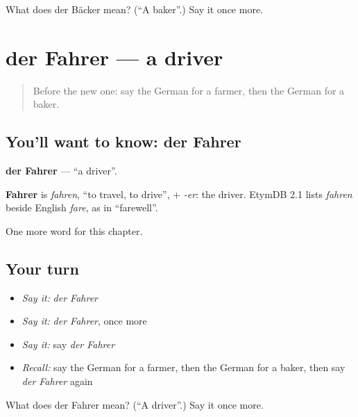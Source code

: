 \begin{tcolorbox}[breakable,colback=teal!4,colframe=teal!35!black,title={Before you move on}]
What does der Bäcker mean? (\textquotedblleft{}A baker\textquotedblright{}.) Say it once more.
\end{tcolorbox}
\section[der Fahrer]{der Fahrer — a driver}

\label{lesson:GE-C125-fahrer}



\begin{quote}
Before the new one: say the German for a farmer, then the German for a baker.
\end{quote}

\subsection*{You'll want to know: der Fahrer}
\textbf{der Fahrer} — \textquotedblleft{}a driver\textquotedblright{}.

\begin{cousinweb}
\textbf{Fahrer} is \emph{fahren}, \textquotedblleft{}to travel, to drive\textquotedblright{}, + \emph{-er}: the driver. EtymDB 2.1 lists \emph{fahren} beside English \emph{fare}, as in \textquotedblleft{}farewell\textquotedblright{}.
\end{cousinweb}

\begin{grammarlens}[title={What you've built}]
One more word for this chapter.
\end{grammarlens}

\subsection*{Your turn}
\begin{itemize}
\raggedright
  \item \emph{Say it:} \emph{der Fahrer}
  \item \emph{Say it:} \emph{der Fahrer}, once more
  \item \emph{Say it:} say \emph{der Fahrer}
  \item \emph{Recall:} say the German for a farmer, then the German for a baker, then say \emph{der Fahrer} again
\end{itemize}

\begin{tcolorbox}[breakable,colback=teal!4,colframe=teal!35!black,title={Before you move on}]
What does der Fahrer mean? (\textquotedblleft{}A driver\textquotedblright{}.) Say it once more.
\end{tcolorbox}
